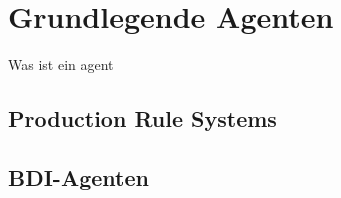 

\chapter{Grundlegende Agenten}
Was ist ein agent


\section{Production Rule Systems}

\section{BDI-Agenten}
